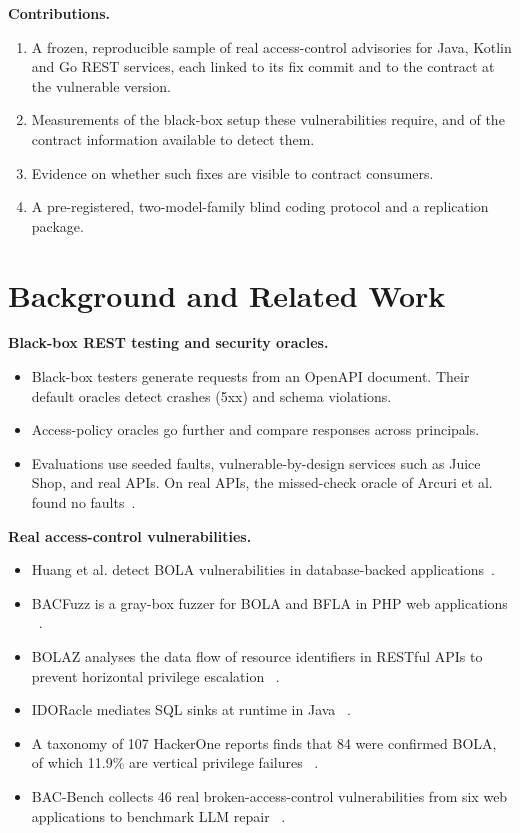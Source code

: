 \documentclass[conference]{IEEEtran}
\begin{document}
\textbf{Contributions.}
\begin{enumerate}
\item A frozen, reproducible sample of real access-control advisories for Java, Kotlin and Go REST services, each linked to its fix commit and to the contract at the vulnerable version.
\item Measurements of the black-box setup these vulnerabilities require, and of the contract information available to detect them.
\item Evidence on whether such fixes are visible to contract consumers.
\item A pre-registered, two-model-family blind coding protocol and a replication package.
\end{enumerate}

\section{Background and Related Work}
\textbf{Black-box REST testing and security oracles.}
\begin{itemize}
\item Black-box testers generate requests from an OpenAPI document. Their default oracles detect crashes (5xx) and schema violations.
\item Access-policy oracles go further and compare responses across principals.
\item Evaluations use seeded faults, vulnerable-by-design services such as Juice Shop, and real APIs. On real APIs, the missed-check oracle of Arcuri et al. found no faults~\cite{arcuri2025access}.
\end{itemize}

\textbf{Real access-control vulnerabilities.}
\begin{itemize}
\item Huang et al. detect BOLA vulnerabilities in database-backed applications~\cite{huang2024bola}.
\item BACFuzz is a gray-box fuzzer for BOLA and BFLA in PHP web applications ~\cite{arXiv2507_15984}.
\item BOLAZ analyses the data flow of resource identifiers in RESTful APIs to prevent horizontal privilege escalation ~\cite{arXiv2507_02309}.
\item IDORacle mediates SQL sinks at runtime in Java ~\cite{arXiv2609_12426}.
\item A taxonomy of 107 HackerOne reports finds that 84 were confirmed BOLA, of which 11.9\% are vertical privilege failures ~\cite{arXiv2605_25865}.
\item BAC-Bench collects 46 real broken-access-control vulnerabilities from six web applications to benchmark LLM repair ~\cite{arXiv2610_34290}.
\end{itemize}
\end{document}
